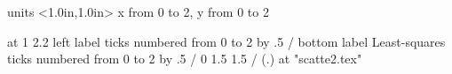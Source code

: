 %
%

\beginpicture
  \setcoordinatesystem units <1.0in,1.0in>
  \ninerm
  \setplotarea x from 0 to 2, y from 0 to 2 
  
  at 1 2.2
  \axis left label {} 
    ticks numbered from 0 to 2 by .5 /
  \axis bottom label {Least-squares}
    ticks numbered from 0 to 2 by .5 /
  0 1.5 1.5 /
  \setplotsymbol ({\rm .})
  at "scatte2.tex"
\endpicture
